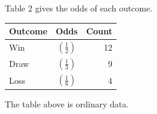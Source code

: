 \documentclass{article}
\begin{document}
Table 2 gives the odds of each outcome.

\begin{table}[h]\centering
\begin{tabular}{lcr}
\toprule
Outcome & Odds & Count \\
\midrule
Win & $\left(\frac{1}{2}\right)$ & 12 \\
Draw & $\left(\frac{1}{3}\right)$ & 9 \\
Loss & $\left(\frac{1}{6}\right)$ & 4 \\
\bottomrule
\end{tabular}
\end{table}
The table above is ordinary data.
\end{document}
